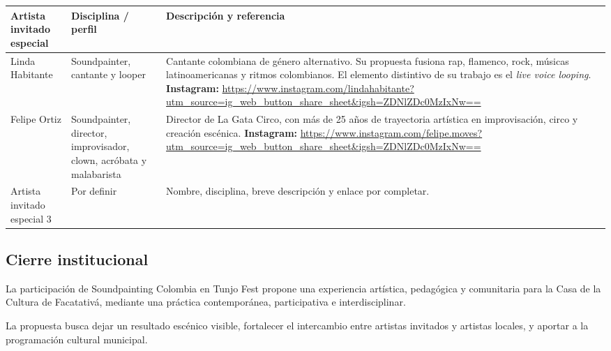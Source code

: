 \documentclass[11pt,a4paper]{article}
\newcommand{\SectionTone}{SectionBlue}
\newcommand{\tableheadcolor}{\rowcolor{\SectionTone!22}}
\begin{document}
\begin{tabularx}{\textwidth}{@{}L{0.22\textwidth}L{0.23\textwidth}Y@{}}
	\toprule
	\tableheadcolor
	\textbf{Artista invitado especial} & \textbf{Disciplina / perfil} & \textbf{Descripción y referencia} \\
	\midrule
	
	Linda Habitante &
	Soundpainter, cantante y looper &
	Cantante colombiana de género alternativo. Su propuesta fusiona rap, flamenco, rock, músicas latinoamericanas y ritmos colombianos. El elemento distintivo de su trabajo es el \textit{live voice looping}. 
	\newline \textbf{Instagram:} \url{https://www.instagram.com/lindahabitante?utm_source=ig_web_button_share_sheet&igsh=ZDNlZDc0MzIxNw==} \\
	
	\addlinespace
	
	Felipe Ortiz &
	Soundpainter, director, improvisador, clown, acróbata y malabarista &
	Director de La Gata Circo, con más de 25 años de trayectoria artística en improvisación, circo y creación escénica.
	\newline \textbf{Instagram:} \url{https://www.instagram.com/felipe.moves?utm_source=ig_web_button_share_sheet&igsh=ZDNlZDc0MzIxNw==} \\
	
	\addlinespace
	
	Artista invitado especial 3 &
	Por definir &
	Nombre, disciplina, breve descripción y enlace por completar. \\
	
	\bottomrule
\end{tabularx}

\subsection{Cierre institucional}

\begin{tcolorbox}[institutionalbox,colback=SectionViolet!24,colframe=SectionViolet!70!black]
La participación de Soundpainting Colombia en Tunjo Fest propone una experiencia artística, pedagógica y comunitaria para la Casa de la Cultura de Facatativá, mediante una práctica contemporánea, participativa e interdisciplinar.

La propuesta busca dejar un resultado escénico visible, fortalecer el intercambio entre artistas invitados y artistas locales, y aportar a la programación cultural municipal.
\end{tcolorbox}
\end{document}
